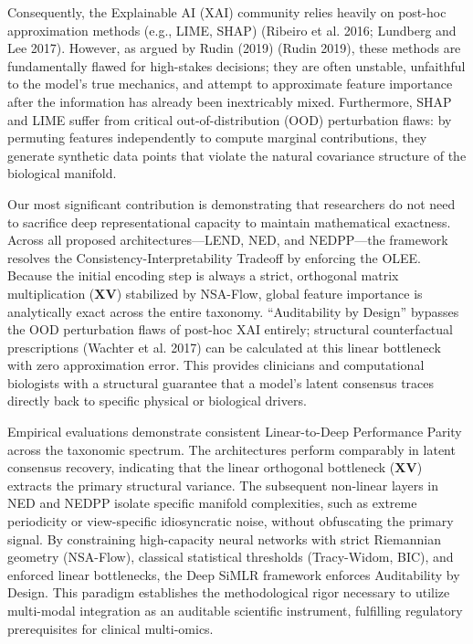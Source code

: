 \documentclass[
  letterpaper,
]{report}
\begin{document}
Consequently, the Explainable AI (XAI) community relies heavily on
post-hoc approximation methods (e.g., LIME, SHAP) (Ribeiro et al. 2016;
Lundberg and Lee 2017). However, as argued by Rudin (2019) (Rudin 2019),
these methods are fundamentally flawed for high-stakes decisions; they
are often unstable, unfaithful to the model's true mechanics, and
attempt to approximate feature importance after the information has
already been inextricably mixed. Furthermore, SHAP and LIME suffer from
critical out-of-distribution (OOD) perturbation flaws: by permuting
features independently to compute marginal contributions, they generate
synthetic data points that violate the natural covariance structure of
the biological manifold.

Our most significant contribution is demonstrating that researchers do
not need to sacrifice deep representational capacity to maintain
mathematical exactness. Across all proposed architectures---LEND, NED,
and NEDPP---the framework resolves the Consistency-Interpretability
Tradeoff by enforcing the OLEE. Because the initial encoding step is
always a strict, orthogonal matrix multiplication
(\(\mathbf{X}\mathbf{V}\)) stabilized by NSA-Flow, global feature
importance is analytically exact across the entire taxonomy.
``Auditability by Design'' bypasses the OOD perturbation flaws of
post-hoc XAI entirely; structural counterfactual prescriptions (Wachter
et al. 2017) can be calculated at this linear bottleneck with zero
approximation error. This provides clinicians and computational
biologists with a structural guarantee that a model's latent consensus
traces directly back to specific physical or biological drivers.

Empirical evaluations demonstrate consistent Linear-to-Deep Performance
Parity across the taxonomic spectrum. The architectures perform
comparably in latent consensus recovery, indicating that the linear
orthogonal bottleneck (\(\mathbf{X}\mathbf{V}\)) extracts the primary
structural variance. The subsequent non-linear layers in NED and NEDPP
isolate specific manifold complexities, such as extreme periodicity or
view-specific idiosyncratic noise, without obfuscating the primary
signal. By constraining high-capacity neural networks with strict
Riemannian geometry (NSA-Flow), classical statistical thresholds
(Tracy-Widom, BIC), and enforced linear bottlenecks, the Deep SiMLR
framework enforces Auditability by Design. This paradigm establishes the
methodological rigor necessary to utilize multi-modal integration as an
auditable scientific instrument, fulfilling regulatory prerequisites for
clinical multi-omics.
\end{document}
